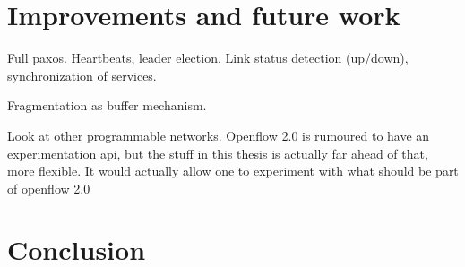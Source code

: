 \chapter{Improvements and future work}

Full paxos. Heartbeats, leader election.
Link status detection (up/down), synchronization of services.

Fragmentation as buffer mechanism.

Look at other programmable networks.
Openflow 2.0 is rumoured to have an experimentation api, but the stuff in
this thesis is actually far ahead of that, more flexible.
It would actually allow one to experiment with what should be part of
openflow 2.0

\chapter{Conclusion}

